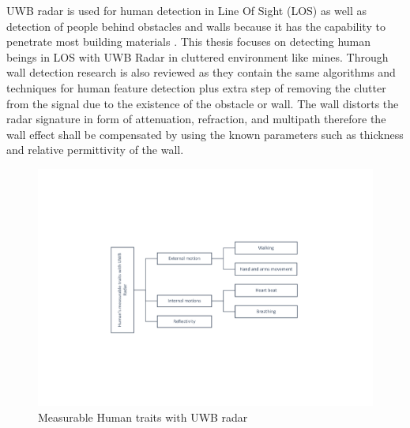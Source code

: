 UWB radar is used for human detection in Line Of Sight (LOS) \cite{Kilic2014,Shingu2008,Chang2009} as well as detection of people behind obstacles and walls because it has the capability to penetrate most building materials \cite{Sachs2008,Nezirovic2010,Rovnakova2013,Zetik}. This thesis focuses on detecting human beings in LOS with UWB Radar in cluttered environment like mines. 
 Through wall detection research is also reviewed as they contain the same algorithms and  techniques for human feature detection plus extra step of removing the clutter from the signal due to the existence of the obstacle or wall. The wall distorts the radar signature in form of attenuation, refraction, and multipath therefore the wall effect shall be compensated by using the known parameters such as thickness and relative permittivity of the wall. 


\begin{figure}[t!]
  \includegraphics[width=\textwidth]{Figures/graph.pdf}
  \caption{Measurable Human traits with UWB radar}
  \label{fig:HumanDetectionWithRadar}
\end{figure}


